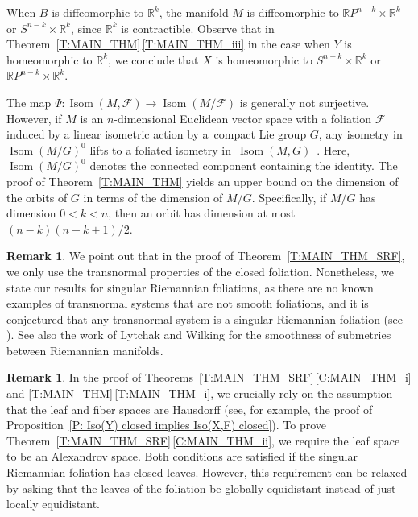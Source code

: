 \documentclass[pdftex]{sigma}
\numberwithin{equation}{section}
\theoremstyle{definition}
\newtheorem{rem}[thm]{Remark}
\DeclareMathOperator{\Iso}{Isom}
\newcommand{\R}{\mathbb{R}} %
\newcommand{\RP}{\mathbb{R}P} %
\newcommand{\fol}{\mathcal{F}}
\begin{document}
When $B$ is diffeomorphic to $\R^k$, the manifold $M$ is diffeomorphic to $\R P^{n-k}\times \R^k$ or $S^{n-k}\times \R^k$, since $\R^k$ is contractible. Observe that in Theorem~\ref{T:MAIN_THM}\,\ref{T:MAIN_THM_iii} in the case when $Y$ is homeomorphic to $\R^k$, we conclude that $X$ is homeomorphic to $S^{n-k}\times\R^k$ or $\RP^{n-k}\times\R^k$.

The map $\Psi\colon\Iso(M,\fol)\to \Iso(M/\fol)$ is generally not surjective. However, if $M$ is an $n$-dimensional Euclidean vector space with a foliation $\fol$ induced by a linear isometric action by a~compact Lie group $G$, any isometry in $\Iso(M/G)^0$ lifts to a foliated isometry in~$\Iso(M,G)$~\cite{Mendes2020}. Here, $\Iso(M/G)^0$ denotes the connected component containing the identity. The proof of Theorem~\ref{T:MAIN_THM} yields an upper bound on the dimension of the orbits of $G$ in terms of the dimension of $M/G$. Specifically, if $M/G$ has dimension $0<k<n$, then an orbit has dimension at most~${(n-k)(n-k+1)/2}$.

\begin{rem}
We point out that in the proof of Theorem~\ref{T:MAIN_THM_SRF}, we only use the transnormal properties of the closed foliation. Nonetheless, we state our results for singular Riemannian foliations, as there are no known examples of transnormal systems that are not smooth foliations, and it is conjectured that any transnormal system is a singular Riemannian foliation (see \cite[Final remarks]{Wilking2007}).
See also the work of Lytchak and Wilking \cite{LytchakWilking2024} for the smoothness of submetries between Riemannian manifolds.
\end{rem}

\begin{rem}
In the proof of Theorems~\ref{T:MAIN_THM_SRF}\,\ref{C:MAIN_THM_i} and \ref{T:MAIN_THM}\,\ref{T:MAIN_THM_i}, we crucially rely on the assumption that the leaf and fiber spaces are Hausdorff (see, for example, the proof of Proposition~\ref{P: Iso(Y) closed implies Iso(X,F) closed}).
To prove Theorem~\ref{T:MAIN_THM_SRF}\,\ref{C:MAIN_THM_ii}, we require the leaf space to be an Alexandrov space. Both conditions are satisfied if the singular Riemannian foliation has closed leaves. However, this requirement can be relaxed by asking that the leaves of the foliation be globally equidistant instead of just locally equidistant.
\end{rem}
\end{document}
